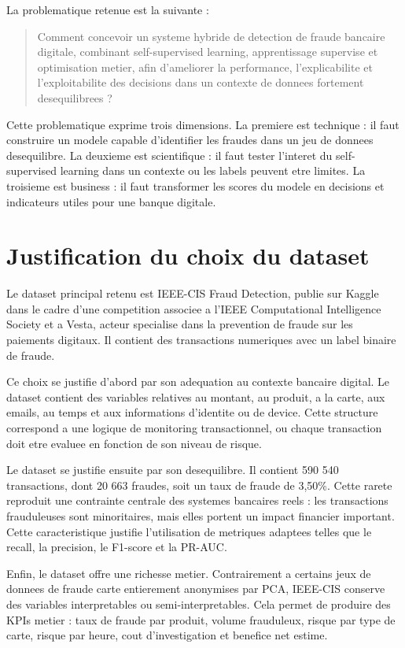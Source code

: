 ﻿\documentclass[12pt,a4paper,oneside]{report}
\begin{document}
La problematique retenue est la suivante :

\begin{quote}
Comment concevoir un systeme hybride de detection de fraude bancaire digitale, combinant self-supervised learning, apprentissage supervise et optimisation metier, afin d'ameliorer la performance, l'explicabilite et l'exploitabilite des decisions dans un contexte de donnees fortement desequilibrees ?
\end{quote}

Cette problematique exprime trois dimensions. La premiere est technique : il faut construire un modele capable d'identifier les fraudes dans un jeu de donnees desequilibre. La deuxieme est scientifique : il faut tester l'interet du self-supervised learning dans un contexte ou les labels peuvent etre limites. La troisieme est business : il faut transformer les scores du modele en decisions et indicateurs utiles pour une banque digitale.

\section{Justification du choix du dataset}

Le dataset principal retenu est IEEE-CIS Fraud Detection, publie sur Kaggle dans le cadre d'une competition associee a l'IEEE Computational Intelligence Society et a Vesta, acteur specialise dans la prevention de fraude sur les paiements digitaux. Il contient des transactions numeriques avec un label binaire de fraude.

Ce choix se justifie d'abord par son adequation au contexte bancaire digital. Le dataset contient des variables relatives au montant, au produit, a la carte, aux emails, au temps et aux informations d'identite ou de device. Cette structure correspond a une logique de monitoring transactionnel, ou chaque transaction doit etre evaluee en fonction de son niveau de risque.

Le dataset se justifie ensuite par son desequilibre. Il contient 590 540 transactions, dont 20 663 fraudes, soit un taux de fraude de 3,50\%. Cette rarete reproduit une contrainte centrale des systemes bancaires reels : les transactions frauduleuses sont minoritaires, mais elles portent un impact financier important. Cette caracteristique justifie l'utilisation de metriques adaptees telles que le recall, la precision, le F1-score et la PR-AUC.

Enfin, le dataset offre une richesse metier. Contrairement a certains jeux de donnees de fraude carte entierement anonymises par PCA, IEEE-CIS conserve des variables interpretables ou semi-interpretables. Cela permet de produire des KPIs metier : taux de fraude par produit, volume frauduleux, risque par type de carte, risque par heure, cout d'investigation et benefice net estime.
\end{document}
